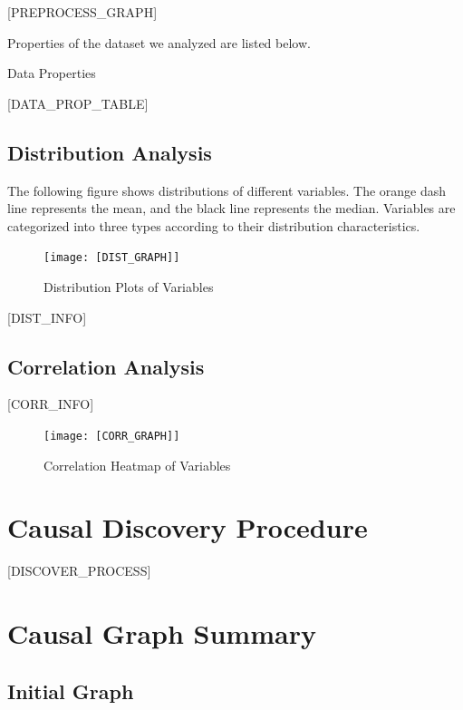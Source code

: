 \documentclass{article}
\begin{document}
[PREPROCESS_GRAPH]

Properties of the dataset we analyzed are listed below.

\begin{table}[H]
    \centering
    \caption{Data Properties}
[DATA_PROP_TABLE]
\end{table}


\subsection{Distribution Analysis}
The following figure shows distributions of different variables. The orange dash line represents the mean, 
and the black line represents the median. Variables are categorized into three types according to their distribution characteristics.

\begin{figure}[H]
\centering
\texttt{[image: [DIST\_GRAPH]]}
\caption{\label{fig:dist}Distribution Plots of Variables}
\end{figure}

[DIST_INFO]

\subsection{Correlation Analysis}

\begin{minipage}[t]{0.5\linewidth}
    [CORR_INFO]
\vfill
\end{minipage}
\hfill
\begin{minipage}[t]{0.5\linewidth}
    \begin{figure}[H]
        \centering
        \vspace{-1.5cm}
        \texttt{[image: [CORR\_GRAPH]]}
        \caption{\label{fig:corr}Correlation Heatmap of Variables}
    \end{figure}
\end{minipage}

\section{Causal Discovery Procedure}
[DISCOVER_PROCESS]

\section{Causal Graph Summary}

\subsection{Initial Graph}
\end{document}
